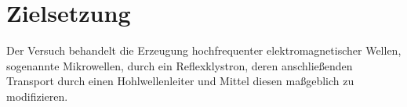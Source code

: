 \section{Zielsetzung}
Der Versuch behandelt die Erzeugung hochfrequenter elektromagnetischer Wellen, 
sogenannte Mikrowellen, durch ein Reflexklystron, deren anschließenden Transport durch einen Hohlwellenleiter und Mittel diesen maßgeblich zu modifizieren.